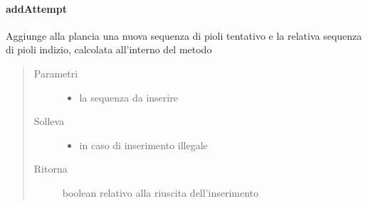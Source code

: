 \documentclass[letterpaper,10pt,italian,openany,oneside]{sphinxmanual}
\begin{document}
\paragraph{addAttempt}
\label{\detokenize{source/it/unicam/cs/pa/mastermind/gamecore/BoardModel:addattempt}}

\begin{fulllineitems}
\label{\detokenize{source/it/unicam/cs/pa/mastermind/gamecore/BoardModel:it.unicam.cs.pa.mastermind.gamecore.BoardModel.addAttempt(List)}}
Aggiunge alla plancia una nuova sequenza di pioli tentativo e la relativa sequenza di pioli indizio, calcolata all’interno del metodo
\begin{quote}\begin{description}
\item[{Parametri}] \leavevmode\begin{itemize}
\item {} 
 \textendash{} la sequenza da inserire

\end{itemize}

\item[{Solleva}] \leavevmode\begin{itemize}
\item {} 
 \textendash{} in caso di inserimento illegale

\end{itemize}

\item[{Ritorna}] \leavevmode
boolean relativo alla riuscita dell’inserimento

\end{description}\end{quote}

\end{fulllineitems}
\end{document}
